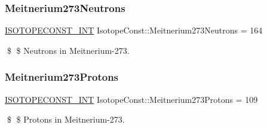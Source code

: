 \subsubsection{\texorpdfstring{Meitnerium273\+Neutrons}{Meitnerium273Neutrons}}
{\footnotesize\ttfamily \mbox{\hyperlink{group___isotope_const-_macros_ga5f18360b3e99483a35c32d789e62621c}{I\+S\+O\+T\+O\+P\+E\+C\+O\+N\+S\+T\+\_\+\+I\+NT}} Isotope\+Const\+::\+Meitnerium273\+Neutrons = 164}

\$ \$ Neutrons in Meitnerium-\/273. \mbox{\label{group___isotope_const-_meitnerium-_mt273_ga98c806a37e8fb0ebc63428be95aabe04}} 
\subsubsection{\texorpdfstring{Meitnerium273\+Protons}{Meitnerium273Protons}}
{\footnotesize\ttfamily \mbox{\hyperlink{group___isotope_const-_macros_ga5f18360b3e99483a35c32d789e62621c}{I\+S\+O\+T\+O\+P\+E\+C\+O\+N\+S\+T\+\_\+\+I\+NT}} Isotope\+Const\+::\+Meitnerium273\+Protons = 109}

\$ \$ Protons in Meitnerium-\/273. 
